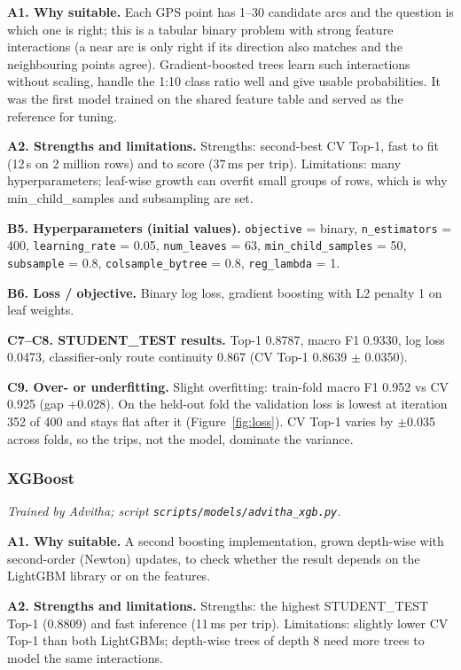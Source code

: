 \documentclass[11pt,a4paper]{article}
\begin{document}
\textbf{A1. Why suitable.} Each GPS point has 1--30 candidate arcs and the question is which one is right; this is a tabular binary problem with strong feature interactions (a near arc is only right if its direction also matches and the neighbouring points agree). Gradient-boosted trees learn such interactions without scaling, handle the 1:10 class ratio well and give usable probabilities. It was the first model trained on the shared feature table and served as the reference for tuning.

\textbf{A2. Strengths and limitations.} Strengths: second-best CV Top-1, fast to fit (12\,s on 2 million rows) and to score (37\,ms per trip). Limitations: many hyperparameters; leaf-wise growth can overfit small groups of rows, which is why min\_child\_samples and subsampling are set.

\textbf{B5. Hyperparameters (initial values).} \texttt{objective} = binary, \texttt{n\_estimators} = 400, \texttt{learning\_rate} = 0.05, \texttt{num\_leaves} = 63, \texttt{min\_child\_samples} = 50, \texttt{subsample} = 0.8, \texttt{colsample\_bytree} = 0.8, \texttt{reg\_lambda} = 1.

\textbf{B6. Loss / objective.} Binary log loss, gradient boosting with L2 penalty 1 on leaf weights.

\textbf{C7--C8. STUDENT\_TEST results.} Top-1 0.8787, macro F1 0.9330, log loss 0.0473, classifier-only route continuity 0.867 (CV Top-1 0.8639 $\pm$ 0.0350).

\textbf{C9. Over- or underfitting.} Slight overfitting: train-fold macro F1 0.952 vs CV 0.925 (gap +0.028). On the held-out fold the validation loss is lowest at iteration 352 of 400 and stays flat after it (Figure~\ref{fig:loss}). CV Top-1 varies by $\pm$0.035 across folds, so the trips, not the model, dominate the variance.
\subsubsection{XGBoost}
\textit{Trained by Advitha; script \texttt{scripts/models/advitha\_xgb.py}.}

\textbf{A1. Why suitable.} A second boosting implementation, grown depth-wise with second-order (Newton) updates, to check whether the result depends on the LightGBM library or on the features.

\textbf{A2. Strengths and limitations.} Strengths: the highest STUDENT\_TEST Top-1 (0.8809) and fast inference (11\,ms per trip). Limitations: slightly lower CV Top-1 than both LightGBMs; depth-wise trees of depth 8 need more trees to model the same interactions.
\end{document}
